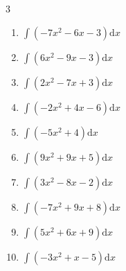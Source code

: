 \begin{multicols}{3}
\begin{enumerate}

\columnbreak %

\resetques

  \item $\displaystyle \int \left( -7x^{2}-6x-3 \right) \mathrm{d}x$


  \item $\displaystyle \int \left( 6x^{2}-9x-3 \right) \mathrm{d}x$


  \item $\displaystyle \int \left( 2x^{2}-7x+3 \right) \mathrm{d}x$


  \item $\displaystyle \int \left( -2x^{2}+4x-6 \right) \mathrm{d}x$


  \item $\displaystyle \int \left( -5x^{2}+4 \right) \mathrm{d}x$


  \item $\displaystyle \int \left( 9x^{2}+9x+5 \right) \mathrm{d}x$


  \item $\displaystyle \int \left( 3x^{2}-8x-2 \right) \mathrm{d}x$


  \item $\displaystyle \int \left( -7x^{2}+9x+8 \right) \mathrm{d}x$


  \item $\displaystyle \int \left( 5x^{2}+6x+9 \right) \mathrm{d}x$


  \item $\displaystyle \int \left( -3x^{2}+x-5 \right) \mathrm{d}x$


\end{enumerate}
\end{multicols}
